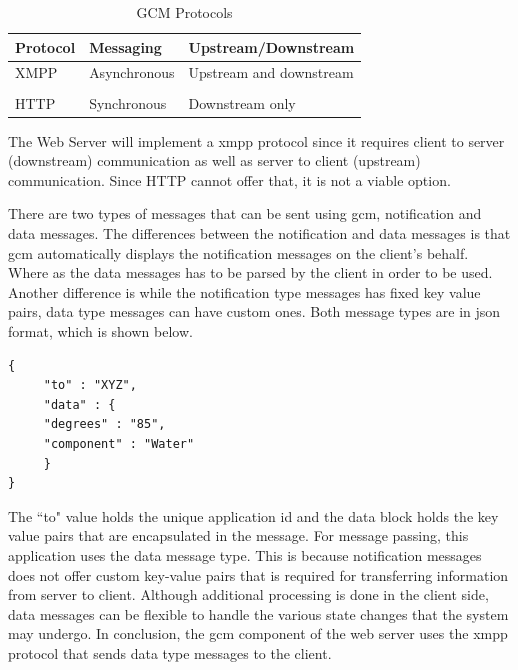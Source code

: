 \documentclass{article}
\begin{document}
\begin{table}[H]
\caption{GCM Protocols}
\centering
\begin{tabularx}{\textwidth}{l l Z}
\toprule
\textbf{Protocol} & \textbf{Messaging}    & \textbf{Upstream/Downstream}     \\
\midrule
XMPP     & Asynchronous & Upstream and downstream \\\\
HTTP     & Synchronous  & Downstream only \\
\bottomrule
\end{tabularx}
\label{tab:gcm-protocol}
\end{table}

The Web Server will implement a \gls{xmpp} protocol since it requires client to server (downstream) communication as well as server to client (upstream) communication. Since HTTP cannot offer that, it is not a viable option.

There are two types of messages that can be sent using \gls{gcm}, notification and data messages. The differences between the notification and data messages is that \gls{gcm} automatically displays the notification messages on the client's behalf. Where as the data messages has to be parsed by the client in order to be used. Another difference is while the notification type messages has fixed key value pairs, data type messages can have custom ones. Both message types are in \gls{json} format, which is shown below.

\begin{lstlisting}
{
     "to" : "XYZ",
     "data" : {
     "degrees" : "85",
     "component" : "Water"
     }
}
\end{lstlisting}

The ``to" value holds the unique application id and the data block holds the key value pairs that are encapsulated in the message.
For message passing, this application uses the data message type. This is because notification messages does not offer custom key-value pairs that is required for transferring information from server to client. Although additional processing is done in the client side, data messages can be flexible to handle the various state changes that the system may undergo. In conclusion, the \gls{gcm} component of the web server uses the \gls{xmpp} protocol that sends data type messages to the client. 
\end{document}
